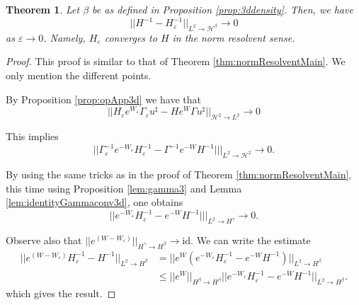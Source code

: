 \documentclass[11pt, oneside]{article}   	%
\newtheorem{theorem}{Theorem}[section]
\begin{document}
	\begin{theorem} \label{thm:normResolventMain3d}
	Let $\beta$ be as defined in Proposition \ref{prop:3ddensity}.  Then, we have
	\[
	|| H^{-1} - H_\varepsilon^{-1} ||_{L^2 \rightarrow \mathscr{H}^\beta} \rightarrow 0
	\]
	as $\varepsilon \rightarrow 0$. Namely, $H_\varepsilon $ converges to $H$ in the norm resolvent sense.
\end{theorem}


\begin{proof}
	This proof is similar to that of Theorem \ref{thm:normResolventMain}. We only mention the different points.  
	
	By Proposition \ref{prop:opApp3d} we have that
	\[
	||H_\varepsilon e^{W_\varepsilon} \Gamma_\varepsilon u^\sharp - H e^{W} \Gamma u^\sharp||_{\mathscr{H}^2  \rightarrow L^2} \rightarrow  0
	\]
	
	
	This implies 
	\[
	||\Gamma_\varepsilon^{-1} e^{-W_\varepsilon} H_\varepsilon^{-1}   - \Gamma^{-1} e^{-W} H^{-1}|||_{L^2 \rightarrow \mathscr{H}^2 } \rightarrow 0.
	\]

	By using the same tricks as in the proof of Theorem \ref{thm:normResolventMain}, this time using Proposition \ref{lem:gamma3} and Lemma \ref{lem:identityGammaconv3d}, one obtains
	\[
	|| e^{-W_\varepsilon} H_\varepsilon^{-1}   - e^{-W} H^{-1}|||_{L^2 \rightarrow H^\gamma} \rightarrow 0.
	\]
	
	Observe also that $|| e^{(W-W_\varepsilon)} ||_{H^\gamma \rightarrow H^\beta} \rightarrow \text{id}$.  We can write the estimate
	\begin{align*}
	|| e^{(W-W_\varepsilon)} H_\varepsilon^{-1}   -  H^{-1}||_{L^2 \rightarrow H^\beta}&= || e^{W}(e^{-W_\varepsilon} H_\varepsilon^{-1}   - e^{-W} H^{-1})||_{L^2 \rightarrow H^{\beta}}\\ &\leq || e^{W}||_{ H^\beta \rightarrow H^\beta} ||e^{-W_\varepsilon} H_\varepsilon^{-1}   - e^{-W} H^{-1}||_{L^2 \rightarrow H^\beta}.
	\end{align*}
	which gives the result.
\end{proof}




\end{document}
